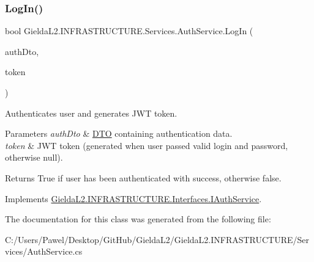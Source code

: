 \subsubsection{\texorpdfstring{LogIn()}{LogIn()}}
{\footnotesize\ttfamily bool Gielda\+L2.\+I\+N\+F\+R\+A\+S\+T\+R\+U\+C\+T\+U\+R\+E.\+Services.\+Auth\+Service.\+Log\+In (\begin{DoxyParamCaption}\item[{\mbox{\hyperlink{class_gielda_l2_1_1_i_n_f_r_a_s_t_r_u_c_t_u_r_e_1_1_d_t_o_1_1_auth_d_t_o}{Auth\+D\+TO}}}]{auth\+Dto,  }\item[{out string}]{token }\end{DoxyParamCaption})}



Authenticates user and generates J\+WT token. 


\begin{DoxyParams}{Parameters}
{\em auth\+Dto} & \mbox{\hyperlink{namespace_gielda_l2_1_1_i_n_f_r_a_s_t_r_u_c_t_u_r_e_1_1_d_t_o}{D\+TO}} containing authentication data.\\
\hline
{\em token} & J\+WT token (generated when user passed valid login and password, otherwise null).\\
\hline
\end{DoxyParams}
\begin{DoxyReturn}{Returns}
True if user has been authenticated with success, otherwise false.
\end{DoxyReturn}


Implements \mbox{\hyperlink{interface_gielda_l2_1_1_i_n_f_r_a_s_t_r_u_c_t_u_r_e_1_1_interfaces_1_1_i_auth_service_a9228c59864a95e038b513ee771f398bb}{Gielda\+L2.\+I\+N\+F\+R\+A\+S\+T\+R\+U\+C\+T\+U\+R\+E.\+Interfaces.\+I\+Auth\+Service}}.



The documentation for this class was generated from the following file\+:\begin{DoxyCompactItemize}
\item 
C\+:/\+Users/\+Pawel/\+Desktop/\+Git\+Hub/\+Gielda\+L2/\+Gielda\+L2.\+I\+N\+F\+R\+A\+S\+T\+R\+U\+C\+T\+U\+R\+E/\+Services/Auth\+Service.\+cs\end{DoxyCompactItemize}
